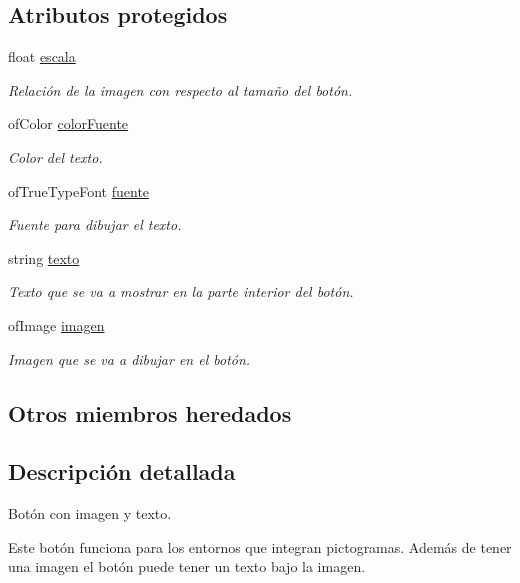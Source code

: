 \subsection*{Atributos protegidos}
\begin{DoxyCompactItemize}
\item 
float \hyperlink{classboton_imagen_a38d03166cf4cc63b616626875fdd817d}{escala}
\begin{DoxyCompactList}\small\item\em Relación de la imagen con respecto al tamaño del botón. \end{DoxyCompactList}\item 
of\+Color \hyperlink{classboton_imagen_ab2d8d1388ec4d76dbcd5e9a61436742c}{color\+Fuente}
\begin{DoxyCompactList}\small\item\em Color del texto. \end{DoxyCompactList}\item 
of\+True\+Type\+Font \hyperlink{classboton_imagen_a7f0f528e711fd891d186b3bfee192e39}{fuente}
\begin{DoxyCompactList}\small\item\em Fuente para dibujar el texto. \end{DoxyCompactList}\item 
string \hyperlink{classboton_imagen_a7118e57f1d4c1d91f2142b908f109f89}{texto}
\begin{DoxyCompactList}\small\item\em Texto que se va a mostrar en la parte interior del botón. \end{DoxyCompactList}\item 
of\+Image \hyperlink{classboton_imagen_a5099abcbecf2cc9d6cdb8cbe5b3a6921}{imagen}
\begin{DoxyCompactList}\small\item\em Imagen que se va a dibujar en el botón. \end{DoxyCompactList}\end{DoxyCompactItemize}
\subsection*{Otros miembros heredados}


\subsection{Descripción detallada}
Botón con imagen y texto. 

Este botón funciona para los entornos que integran pictogramas. Además de tener una imagen el botón puede tener un texto bajo la imagen.

